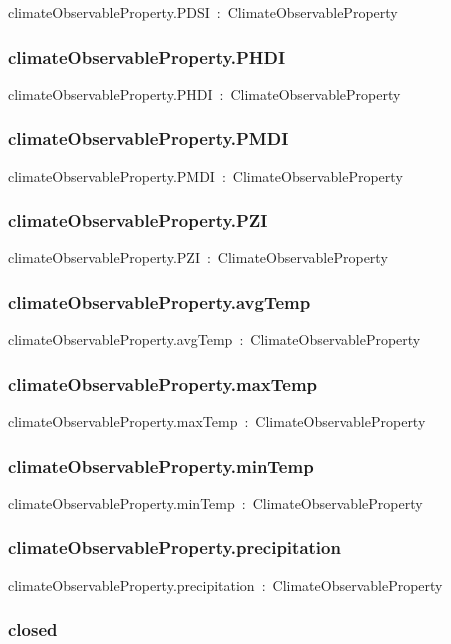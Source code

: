 \documentclass{article}
\begin{document}
climateObservableProperty.PDSI~:~ClimateObservableProperty

\subsubsection*{climateObservableProperty.PHDI}

climateObservableProperty.PHDI~:~ClimateObservableProperty

\subsubsection*{climateObservableProperty.PMDI}

climateObservableProperty.PMDI~:~ClimateObservableProperty

\subsubsection*{climateObservableProperty.PZI}

climateObservableProperty.PZI~:~ClimateObservableProperty

\subsubsection*{climateObservableProperty.avgTemp}

climateObservableProperty.avgTemp~:~ClimateObservableProperty

\subsubsection*{climateObservableProperty.maxTemp}

climateObservableProperty.maxTemp~:~ClimateObservableProperty

\subsubsection*{climateObservableProperty.minTemp}

climateObservableProperty.minTemp~:~ClimateObservableProperty

\subsubsection*{climateObservableProperty.precipitation}

climateObservableProperty.precipitation~:~ClimateObservableProperty

\subsubsection*{closed}
\end{document}

